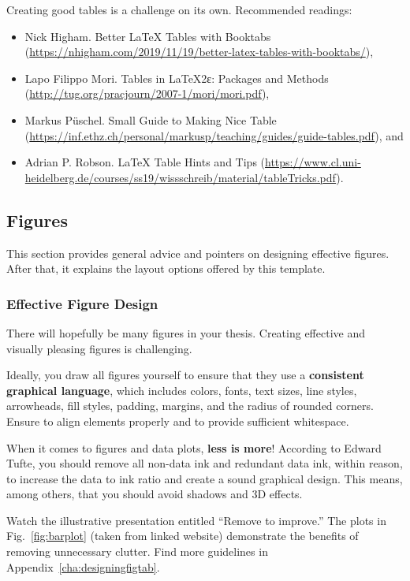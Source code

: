 Creating good tables is a challenge on its own. Recommended readings: 
\begin{itemize}
\item Nick Higham. Better LaTeX Tables with Booktabs (\url{https://nhigham.com/2019/11/19/better-latex-tables-with-booktabs/}),
\item Lapo Filippo Mori. Tables in \LaTeX{}2ε: Packages and Methods (\url{http://tug.org/pracjourn/2007-1/mori/mori.pdf}),
\item Markus Püschel. Small Guide to Making Nice Table (\url{https://inf.ethz.ch/personal/markusp/teaching/guides/guide-tables.pdf}), and
\item Adrian P. Robson. \LaTeX{} Table Hints and Tips (\url{https://www.cl.uni-heidelberg.de/courses/ss19/wissschreib/material/tableTricks.pdf}).
\end{itemize}

\subsection{Figures}

This section provides general advice and pointers on designing effective figures. After that, it explains the layout options offered by this template.

\subsubsection{Effective Figure Design}

There will hopefully be many figures in your thesis. Creating effective and visually pleasing figures is challenging.

Ideally, you draw all figures yourself to ensure that they use a \textbf{consistent graphical language}, which includes colors, fonts, text sizes, line styles, arrowheads, fill styles, padding, margins, and the radius of rounded corners. Ensure to align elements properly and to provide sufficient whitespace.

When it comes to figures and data plots, \textbf{less is more}! According to Edward Tufte,%
you should remove all non-data ink and redundant data ink, within reason, to increase the data to ink ratio and create a sound graphical design. This means, among others, that you should avoid shadows and 3D effects.

Watch the illustrative presentation entitled ``Remove to improve.'' The plots in Fig.~\ref{fig:barplot} (taken from linked website) demonstrate the benefits of removing unnecessary clutter. Find more guidelines in Appendix~\ref{cha:designingfigtab}.


